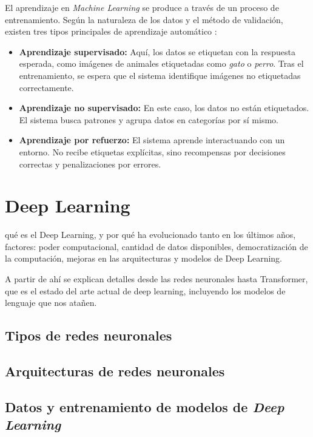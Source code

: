 El aprendizaje en \textit{Machine Learning} se produce a través de un proceso de entrenamiento. Según la naturaleza de los datos y el método de validación, existen tres tipos principales de aprendizaje automático \citep[p. ~38]{torresivinalsPythonDeepLearning2020}:

\begin{itemize}
    \item \textbf{Aprendizaje supervisado:} Aquí, los datos se etiquetan con la respuesta esperada, como imágenes de animales etiquetadas como \textit{gato} o \textit{perro}. Tras el entrenamiento, se espera que el sistema identifique imágenes no etiquetadas correctamente.
    
    \item \textbf{Aprendizaje no supervisado:} En este caso, los datos no están etiquetados. El sistema busca patrones y agrupa datos en categorías por sí mismo.
    
    \item \textbf{Aprendizaje por refuerzo:} El sistema aprende interactuando con un entorno. No recibe etiquetas explícitas, sino recompensas por decisiones correctas y penalizaciones por errores.
\end{itemize}


\section{Deep Learning}

qué es el Deep Learning, y por qué ha evolucionado tanto en los últimos años, factores: poder computacional, cantidad de datos disponibles, democratización de la computación, mejoras en las arquitecturas y modelos de Deep Learning.

A partir de ahí se explican detalles desde las redes neuronales hasta Transformer, que es el estado del arte actual de deep learning, incluyendo los modelos de lenguaje que nos atañen.


\subsection{Tipos de redes neuronales}
\subsection{Arquitecturas de redes neuronales}
\subsection{Datos y entrenamiento de modelos de \textit{Deep Learning}}

